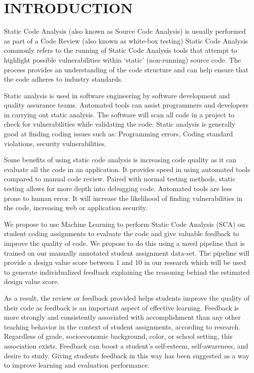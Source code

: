 
\chapter{INTRODUCTION} %
Static Code Analysis (also known as Source Code Analysis) is usually performed as part of a Code Review (also known as white-box testing) Static Code Analysis commonly refers to the running of Static Code Analysis tools that attempt to highlight possible vulnerabilities within ‘static’ (non-running) source code. The process provides an understanding of the code structure and can help ensure that the code adheres to industry standards. 

Static analysis is used in software engineering by software development and quality assurance teams. Automated tools can assist programmers and developers in carrying out static analysis. The software will scan all code in a project to check for vulnerabilities while validating the code. Static analysis is generally good at finding coding issues such as: Programming errors, Coding standard violations, security vulnerabilities. 

Some benefits of using static code analysis is increasing code quality as it can evaluate all the code in an application. It provides speed in using automated tools compared to manual code review. Paired with normal testing methods, static testing allows for more depth into debugging code. Automated tools are less prone to human error. It will increase the likelihood of finding vulnerabilities in the code, increasing web or application security. 

We propose to use Machine Learning to perform Static Code Analysis (SCA) on student coding assignments to evaluate the code and give valuable feedback to improve the quality of code. We propose to do this using a novel pipeline that is trained on our manually annotated  student assignment data-set. The pipeline will provide a design value score between 1 and 10 in our research which will be used to generate  individualized feedback explaining the reasoning behind the estimated design value score.


As a result, the review or feedback provided helps students improve the quality of their code as feedback is an important aspect of effective learning. Feedback is more strongly and consistently associated with accomplishment than any other teaching behavior in the context of student assignments, according to research. Regardless of grade, socioeconomic background, color, or school setting, this association exists. Feedback can boost a student's self-esteem, self-awareness, and desire to study. Giving students feedback in this way has been suggested as a way to improve learning and evaluation performance.
